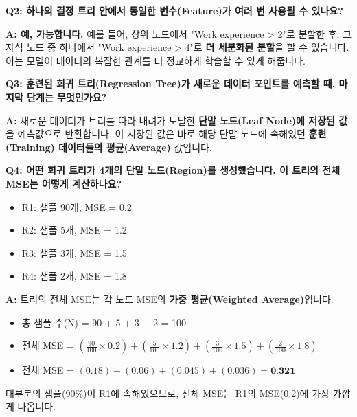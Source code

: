 \documentclass[11pt,a4paper]{book}
\theoremstyle{definition}
\begin{document}
\begin{boxExample}
    \textbf{Q2: 하나의 결정 트리 안에서 동일한 변수(Feature)가 여러 번 사용될 수 있나요?}
    
    \textbf{A: 예, 가능합니다.}
    예를 들어, 상위 노드에서 "Work experience > 2"로 분할한 후, 그 자식 노드 중 하나에서 "Work experience > 4"로 \textbf{더 세분화된 분할}을 할 수 있습니다. 이는 모델이 데이터의 복잡한 관계를 더 정교하게 학습할 수 있게 해줍니다.
\end{boxExample}

\begin{boxExample}
    \textbf{Q3: 훈련된 회귀 트리(Regression Tree)가 새로운 데이터 포인트를 예측할 때, 마지막 단계는 무엇인가요?}
    
    \textbf{A:} 새로운 데이터가 트리를 따라 내려가 도달한 \textbf{단말 노드(Leaf Node)에 저장된 값}을 예측값으로 반환합니다. 이 저장된 값은 바로 해당 단말 노드에 속해있던 \textbf{훈련(Training) 데이터들의 평균(Average)} 값입니다.
\end{boxExample}

\begin{boxExample}
    \textbf{Q4: 어떤 회귀 트리가 4개의 단말 노드(Region)를 생성했습니다. 이 트리의 전체 MSE는 어떻게 계산하나요?}
    
    \begin{itemize}
        \item R1: 샘플 90개, MSE = 0.2
        \item R2: 샘플 5개, MSE = 1.2
        \item R3: 샘플 3개, MSE = 1.5
        \item R4: 샘플 2개, MSE = 1.8
    \end{itemize}
    
    \textbf{A:} 트리의 전체 MSE는 각 노드 MSE의 \textbf{가중 평균(Weighted Average)}입니다.
    
    \begin{itemize}
        \item 총 샘플 수(N) = 90 + 5 + 3 + 2 = 100
        \item 전체 MSE = $(\frac{90}{100} \times 0.2) + (\frac{5}{100} \times 1.2) + (\frac{3}{100} \times 1.5) + (\frac{2}{100} \times 1.8)$
        \item 전체 MSE = $(0.18) + (0.06) + (0.045) + (0.036) = \textbf{0.321}$
    \end{itemize}
    
    대부분의 샘플(90\%)이 R1에 속해있으므로, 전체 MSE는 R1의 MSE(0.2)에 가장 가깝게 나옵니다.
\end{boxExample}
\end{document}
